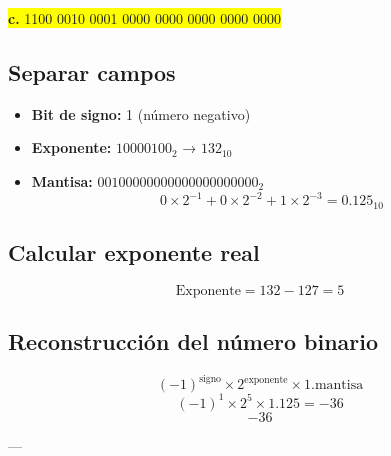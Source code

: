 \documentclass[a4paper,12pt]{article}
\begin{document}
	\begin{center}
		\colorbox{yellow}{\textbf{c.} 1100 0010 0001 0000 0000 0000 0000 0000}
		
		\subsection*{Separar campos}
		
		\begin{itemize}
			\item \textbf{Bit de signo:} 1 (número negativo)
			\item \textbf{Exponente:} $10000100_2$ → $132_{10}$
			\item \textbf{Mantisa:} $00100000000000000000000_2$ 
			\[
			0\times2^{-1} + 0\times2^{-2} + 1\times2^{-3} = 0.125_{10}
			\]
		\end{itemize}
		
		\subsection*{Calcular exponente real}
		
		\[
		\text{Exponente} = 132 - 127 = 5
		\]
		
		
		
		\subsection*{Reconstrucción del número binario}	
		\[
		(-1)^{\text{signo}} \times 2^{\text{exponente}} \times 1.\text{mantisa}
		\]
		\[
		(-1)^1 \times 2^5 \times 1.125 = -36
		\]
		\vspace{1em}
		\[
		\boxed{-36}
		\]
		
		---
	\end{center}
\end{document}
